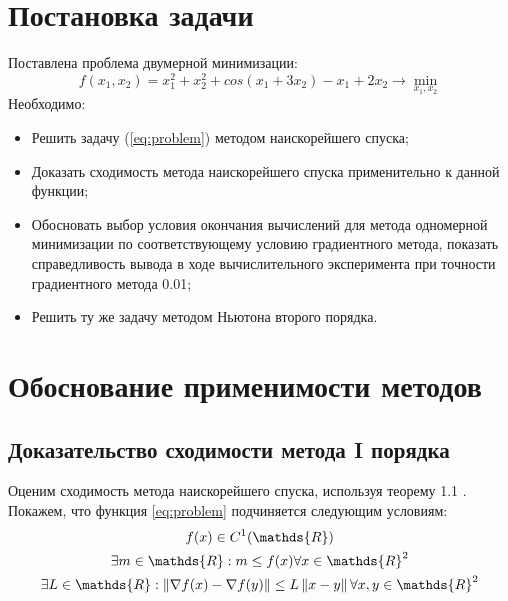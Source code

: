 \documentclass[main.tex]{subfiles}
\begin{document}
	
\section{Постановка задачи}
Поставлена проблема двумерной минимизации:
\begin{equation}\label{eq:problem}
f(x_1, x_2)=x_1^2+x_2^2+cos(x_1+3x_2)-x_1+2x_2 \rightarrow \min_{x_1, x_2}
\end{equation}
Необходимо:
\begin{itemize}
	\item Решить задачу (\ref{eq:problem}) методом наискорейшего спуска;
	\item Доказать сходимость метода наискорейшего спуска применительно к данной функции;
	\item Обосновать выбор условия окончания вычислений для метода одномерной минимизации по соответствующему условию градиентного метода, показать справедливость вывода в ходе вычислительного эксперимента при точности градиентного метода 0.01;
	\item Решить ту же задачу методом Ньютона второго порядка.
\end{itemize}

\section{Обоснование применимости методов}\label{section:proofs}
\subsection{Доказательство сходимости метода I порядка}
Оценим сходимость метода наискорейшего спуска, используя теорему 1.1 \cite{boldirev}. Покажем, что функция \ref{eq:problem} подчиняется следующим условиям:\\
\begin{gather} %
\label{eq:convex} 
f(x) \in C^1(\mathds{R})\\
\label{eq:bounded}
\exists m \in \mathds{R}: m \le f(x) \forall x \in \mathds{R}^2 \\
\label{eq:lipshitz}
\exists L \in \mathds{R}: \norm{\nabla f(x) - \nabla f(y)} \le L\norm{x-y} \forall x,y \in \mathds{R}^2
\end{gather}
\end{document}
